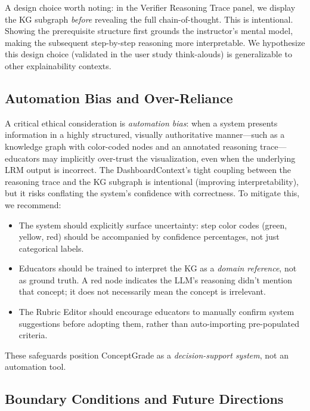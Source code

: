 \documentclass[journal,review]{vgtc}
\begin{document}
A design choice worth noting: in the Verifier Reasoning Trace panel, we display the KG subgraph \textit{before} revealing the full chain-of-thought. This is intentional. Showing the prerequisite structure first grounds the instructor's mental model, making the subsequent step-by-step reasoning more interpretable. We hypothesize this design choice (validated in the user study think-alouds) is generalizable to other explainability contexts.

\subsection{Automation Bias and Over-Reliance}

A critical ethical consideration is \textit{automation bias}: when a system presents information in a highly structured, visually authoritative manner---such as a knowledge graph with color-coded nodes and an annotated reasoning trace---educators may implicitly over-trust the visualization, even when the underlying LRM output is incorrect. The DashboardContext's tight coupling between the reasoning trace and the KG subgraph is intentional (improving interpretability), but it risks conflating the system's confidence with correctness. To mitigate this, we recommend:

\begin{itemize}
  \item The system should explicitly surface uncertainty: step color codes (green, yellow, red) should be accompanied by confidence percentages, not just categorical labels.
  \item Educators should be trained to interpret the KG as a \textit{domain reference}, not as ground truth. A red node indicates the LLM's reasoning didn't mention that concept; it does not necessarily mean the concept is irrelevant.
  \item The Rubric Editor should encourage educators to manually confirm system suggestions before adopting them, rather than auto-importing pre-populated criteria.
\end{itemize}

These safeguards position ConceptGrade as a \textit{decision-support system}, not an automation tool.

\subsection{Boundary Conditions and Future Directions}
\end{document}
